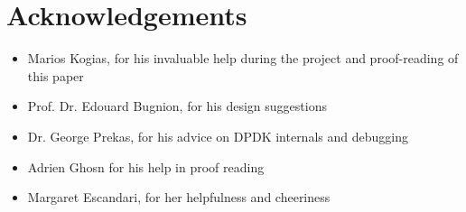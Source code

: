 \chapter*{Acknowledgements}

\begin{itemize}
\item Marios Kogias, for his invaluable help during the project and
  proof-reading of this paper
\item Prof. Dr. Edouard Bugnion, for his design suggestions
\item Dr. George Prekas, for his advice on DPDK internals and
  debugging
\item Adrien Ghosn for his help in proof reading
\item Margaret Escandari, for her helpfulness and cheeriness
\end{itemize}
